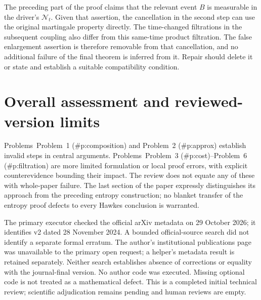 \documentclass[10pt]{article}
\begin{document}
The preceding part of the proof claims that the relevant event \(B\) is measurable in the driver’s \(\mathcal N_t\). Given that assertion, the cancellation in the second step can use the original martingale property directly. The time-changed filtrations in the subsequent coupling also differ from this same-time product filtration. The false enlargement assertion is therefore removable from that cancellation, and no additional failure of the final theorem is inferred from it. Repair should delete it or state and establish a suitable compatibility condition.\par
\section*{Overall assessment and reviewed-version limits}
Problems Problem 1 (\#p:composition) and Problem 2 (\#p:approx) establish invalid steps in central arguments. Problems Problem 3 (\#p:cost)–Problem 6 (\#p:filtration) are more limited formulation or local proof errors, with explicit counterevidence bounding their impact. The review does not equate any of these with whole-paper failure. The last section of the paper expressly distinguishes its approach from the preceding entropy construction; no blanket transfer of the entropy proof defects to every Hawkes conclusion is warranted.\par
The primary executor checked the official arXiv metadata on 29 October 2026; it identifies v2 dated 28 November 2024. A bounded official-source search did not identify a separate formal erratum. The author’s institutional publications page was unavailable to the primary open request; a helper’s metadata result is retained separately. Neither search establishes absence of corrections or equality with the journal-final version. No author code was executed. Missing optional code is not treated as a mathematical defect. This is a completed initial technical review; scientific adjudication remains pending and human reviews are empty.\par
\end{document}
